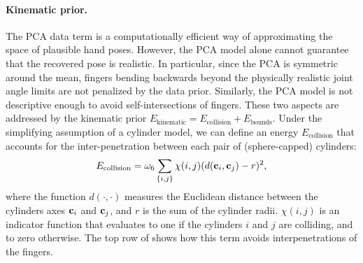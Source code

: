 \paragraph*{Kinematic prior.}
The PCA data term is a computationally efficient way of approximating the space of plausible hand poses.
However, the PCA model alone cannot guarantee that the recovered pose is realistic. In particular, since the PCA is symmetric around the mean, fingers bending backwards beyond the physically realistic joint angle limits are not penalized by the data prior. Similarly, the PCA model is not descriptive enough to avoid self-intersections of fingers. These two aspects are addressed by the kinematic prior $E_{\text{kinematic}} = E_{\text{collision}} + E_{\text{bounds}}$.
%
%
Under the simplifying assumption of a cylinder model, we can define an energy $E_{\text{collision}}$ that accounts for the inter-penetration between each pair of (sphere-capped) cylinders:
% 
\begin{equation}
    E_{\text{collision}} = \omega_6 \sum_{\{i,j\}} {\chi(i,j)}(d(\mathbf{c}_i, \mathbf{c}_j) - r)^2,
\end{equation} 
%
where the function $d(\cdot,\cdot)$ measures the Euclidean distance between the cylinders axes $\mathbf{c}_i$ and $\mathbf{c}_j$, and $r$ is the sum of the cylinder radii. ${\chi(i,j)}$ is an indicator function that evaluates to one if the cylinders $i$ and $j$ are colliding, and to zero otherwise.
The top row of  shows how this term avoids interpenetrations of the fingers.
% 



